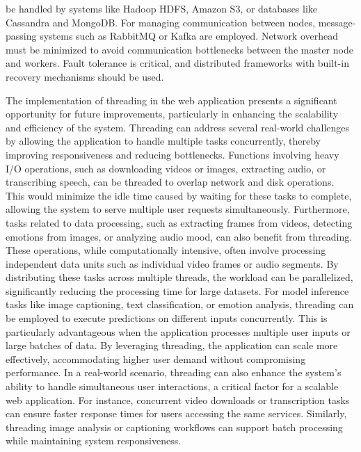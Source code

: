 be handled by systems like Hadoop HDFS, Amazon S3, or databases like Cassandra and MongoDB. For managing communication between nodes, message-passing systems such as RabbitMQ or Kafka are employed. Network overhead must be minimized to avoid communication bottlenecks between the master node and workers. Fault tolerance is critical, and distributed frameworks with built-in recovery mechanisms should be used.

\vspace{1em}

\noindent
The implementation of threading in the web application presents a significant opportunity for future improvements, particularly in enhancing the scalability and efficiency of the system. Threading can address several real-world challenges by allowing the application to handle multiple tasks concurrently, thereby improving responsiveness and reducing bottlenecks. Functions involving heavy I/O operations, such as downloading videos or images, extracting audio, or transcribing speech, can be threaded to overlap network and disk operations. This would minimize the idle time caused by waiting for these tasks to complete, allowing the system to serve multiple user requests simultaneously. Furthermore, tasks related to data processing, such as extracting frames from videos, detecting emotions from images, or analyzing audio mood, can also benefit from threading. These operations, while computationally intensive, often involve processing independent data units such as individual video frames or audio segments. By distributing these tasks across multiple threads, the workload can be parallelized, significantly reducing the processing time for large datasets. For model inference tasks like image captioning, text classification, or emotion analysis, threading can be employed to execute predictions on different inputs concurrently. This is particularly advantageous when the application processes multiple user inputs or large batches of data. By leveraging threading, the application can scale more effectively, accommodating higher user demand without compromising performance. In a real-world scenario, threading can also enhance the system's ability to handle simultaneous user interactions, a critical factor for a scalable web application. For instance, concurrent video downloads or transcription tasks can ensure faster response times for users accessing the same services. Similarly, threading image analysis or captioning workflows can support batch processing while maintaining system responsiveness. 


\pagebreak
